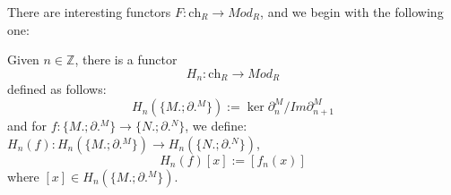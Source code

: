 There are interesting functors $F:\text{ch}_R\to Mod_R$, and we begin with the following one:
\begin{defn}[$H_n$, $n$th-homology]
    Given $n\in\mathbb{Z}$, there is a functor 
    \begin{equation*}
        H_n: \text{ch}_R\to Mod_R
    \end{equation*}
    defined as follows:
    \begin{equation*}
        H_n(\{M.;\partial.^M\}):=\ker\partial_n^M\big/ Im \partial_{n+1}^M
    \end{equation*}
    and for $f:\{M.;\partial.^M\}\to\{N.;\partial.^N\}$, we define: $H_n(f): H_n(\{M.;\partial.^M\})\to H_n(\{N.;\partial.^N\})$,
    \begin{equation*}
        H_n(f)[x]:=[f_n(x)]
    \end{equation*}
    where $[x]\in H_n(\{M.;\partial.^M\})$.
\end{defn}

